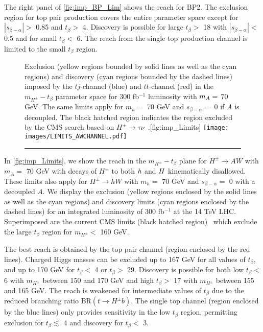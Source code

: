 The right panel of \autoref{fig:imp_BP_Lim} shows the reach for BP2. The exclusion region for top pair production covers the entire parameter space except for $|s_{\beta-\alpha}| >$ 0.85 and $t_{\beta}>$ 4. Discovery is possible for large $t_{\beta}>$ 18 with $|s_{\beta-\alpha}|<$ 0.5 and for small $t_{\beta}<$ 6. The reach from the single top production channel is limited to the small $t_{\beta}$ region.
\begin{figure}
  \begin{sidecaption}{Exclusion (yellow regions bounded by solid lines as well as the cyan regions) and discovery (cyan regions bounded by the dashed lines) imposed by the $tj$-channel (blue) and $tt$-channel (red) in the $m_{H^{\pm}}-t_{\beta}$ parameter space for 300 fb$^{-1}$ luminosity with $m_A=$ 70 GeV. The same limits apply for $m_{h}=$ 70 GeV and $s_{\beta-\alpha}=$ 0 if \emph{A} is decoupled. The black hatched region indicates the region excluded by the CMS search based on $H^{\pm} \rightarrow \tau \nu$~\cite{CMS:2014cdp}.}[fig:imp_Limits]
 \centering
 	\texttt{[image: images/LIMITS\_AWCHANNEL.pdf]}
  \end{sidecaption}
 \vspace{\onelineskip}
\hrule
\end{figure}

In \autoref{fig:imp_Limits}, we show the reach in the $m_{H^{\pm}}-t_{\beta}$ plane for $H^{\pm} \rightarrow AW$ with $m_A=$ 70 GeV with decays of $H^\pm$ to both $h$ and $H$ kinematically disallowed. These limits also apply for $H^{\pm} \rightarrow hW$ with $m_{h}=$ 70 GeV and $s_{\beta-\alpha}=$ 0 with a decoupled $A$. We display the exclusion (yellow regions enclosed by the solid lines as well as the cyan regions) and discovery limits (cyan regions enclosed by the dashed lines) for an integrated luminosity of 300 fb$^{-1}$ at the 14 TeV LHC. Superimposed are the current CMS limits (black hatched region)~\cite{CMS:2014cdp} which exclude the large $t_{\beta}$ region for $m_{H^\pm}<$ 160 GeV. 

The best reach is obtained by the top pair channel (region enclosed by the red lines). Charged Higgs masses can be excluded up to 167 GeV for all values of $t_{\beta}$, and up to 170 GeV for $t_{\beta}<$ 4 or $t_{\beta}>$ 29. Discovery is possible for both low $t_{\beta}<$ 6 with $m_{H^\pm}$ between 150 and 170 GeV and high $t_{\beta} >$ 17 with $m_{H^\pm}$ between 155 and 165 GeV. The reach is weakened for intermediate values of $t_{\beta}$ due to the reduced branching ratio BR$(t \rightarrow H^{\pm} b)$. The single top channel (region enclosed by the blue lines) only provides sensitivity in the low $t_{\beta}$ region, permitting exclusion for $t_{\beta} \lesssim$ 4 and discovery for $t_\beta < $ 3. 

